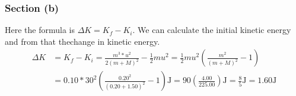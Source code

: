 \documentclass[12pt]{article}
\begin{document}
\pagebreak
\subsubsection*{Section (b)}
Here the formula is \( \Delta K = K_f - K_i \). We can calculate the initial kinetic energy and from that thechange in kinetic energy.
\begin{align*}
    \Delta K    &=  K_f - K_i
        =   \frac{m^3*u^2}{2(m+M)^2} - \frac{1}{2}mu^2
        =   \frac{1}{2}mu^2\left(\frac{m^2}{(m+M)^2} - 1\right)\\
        &=  0.10*30^2\left(\frac{0.20^2}{(0.20+1.50)^2} - 1\right) \unit{\joule}
        =   90\left(\frac{4.00}{225.00}\right) \unit{\joule}
        =   \boxed{\frac{8}{5} \unit{\joule} = 1.60 \unit{\joule}}
\end{align*}
\end{document}
